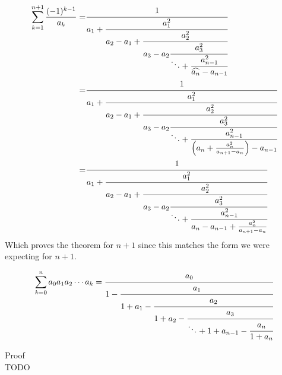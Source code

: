 \documentclass[a4paper]{article}
\begin{document}
\begin{theorem}
        \begin{align*}
            \sum_{k=1}^{n+1} \frac{(-1)^{k-1}}{a_k} =& \cfrac{1}{a_1+\cfrac{a_{1}^{2}}{a_2 - a_1 +\cfrac{a_2^2}{a_3 - a_2
            \cfrac{a_3^2}{\ddots + \cfrac{a_{n-1}^2}{\widehat{a_n} - a_{n-1}}}}}}
            \\
            =& \cfrac{1}{a_1+\cfrac{a_{1}^{2}}{a_2 - a_1 +\cfrac{a_2^2}{a_3 - a_2
            \cfrac{a_3^2}{\ddots + \cfrac{a_{n-1}^2}{\Big( a_{n} + \frac{a_n^2}{a_{n+1} - a_{n}} \Big) - a_{n-1}}}}}}
            \\
            =& \cfrac{1}{a_1+\cfrac{a_{1}^{2}}{a_2 - a_1 +\cfrac{a_2^2}{a_3 - a_2
            \cfrac{a_3^2}{\ddots + \cfrac{a_{n-1}^2}{a_{n} - a_{n-1} + \frac{a_n^2}{a_{n+1} - a_{n}} }}}}}
        \end{align*}
        Which proves the theorem for $n+1$ since this matches the form we were expecting for $n+1$.

    \end{theorem}

    \begin{theorem}
        \label{euler_continued_fraction_formula}
        \[
        \sum_{k=0}^{n}  a_0 a_1 a_2 \cdots a_k = \cfrac{a_0}{1 - \cfrac{a_{1}}{1 + a_1 - \cfrac{a_2}{1 + a_2 -
        \cfrac{a_3}{\ddots +  1 + a_{n-1} - \cfrac{a_{n}}{1 + a_n}}}}}
        \]

        Proof\\
        TODO
    \end{theorem}
\end{document}
